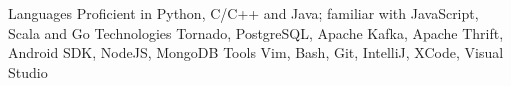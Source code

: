 \begin{cvskills}
  \cvskill
    {Languages}
    {Proficient in Python, C/C++ and Java; familiar with JavaScript, Scala and Go}
  \cvskill
    {Technologies}
    {Tornado, PostgreSQL, Apache Kafka, Apache Thrift, Android SDK, NodeJS, MongoDB}
  \cvskill
    {Tools}
    {Vim, Bash, Git, IntelliJ, XCode, Visual Studio}
\end{cvskills}
